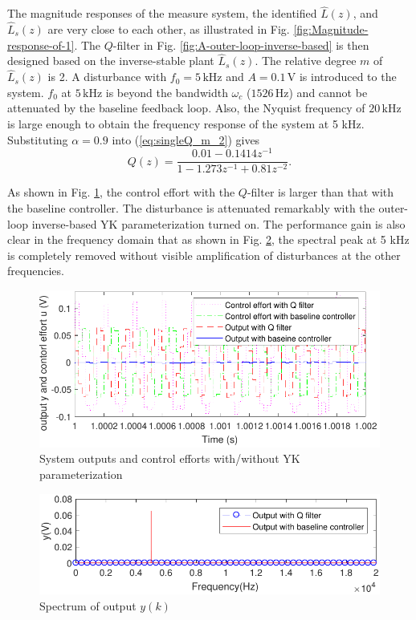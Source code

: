 \documentclass [11pt, proquest] {uwthesis}[2020/02/24]
\begin{document}
The magnitude responses of the measure system, the identified $\hat{L}(z)$,
and $\hat{L}_{s}(z)$ are very close to each other, as illustrated
in Fig. \ref{fig:Magnitude-response-of-1}. The $Q$-filter in Fig.
\ref{fig:A-outer-loop-inverse-based} is then designed based on the
inverse-stable plant $\hat{L}_{s}(z)$. The relative degree $m$ of
$\hat{L}_{s}(z)$ is 2. A disturbance with $f_{0}=5\,\text{kHz}$
and $A=0.1\,\text{V}$ is introduced to the system. $f_{0}$ at $5\,\text{kHz}$
is beyond the bandwidth $\omega_{c}$ ($1526\,\text{Hz}$) and cannot
be attenuated by the baseline feedback loop. Also, the Nyquist frequency
of $20\,\text{kHz}$ is large enough to obtain the frequency response
of the system at 5 kHz. Substituting $\alpha=0.9$ into (\ref{eq:singleQ_m_2})
gives
\begin{equation}
Q(z)=\frac{0.01-0.1414z^{-1}}{1-1.273z^{-1}+0.81z^{-2}}.\label{eq:singleQ_L}
\end{equation}

As shown in Fig. \ref{fig:System-output-with}, the control effort
with the $Q$-filter is larger than that with the baseline controller.
The disturbance is attenuated remarkably with the outer-loop inverse-based
YK parameterization turned on. The performance gain is also clear
in the frequency domain that as shown in Fig. \ref{fig:Spectrum-of-ooutput},
the spectral peak at 5 kHz is completely removed without visible amplification
of disturbances at the other frequencies.
\begin{figure}[!ht]
\begin{centering}
\includegraphics[width=13cm]{Loop-shaping/output_Q_baseline_2}
\par\end{centering}
\caption{\label{fig:System-output-with}System outputs and control efforts
with/without YK parameterization}
\end{figure}
\begin{figure}[!ht]
\begin{centering}
\includegraphics[width=13cm]{Loop-shaping/spectrum}
\par\end{centering}
\caption{\label{fig:Spectrum-of-ooutput}Spectrum of output $y(k)$}
\end{figure}
\end{document}

